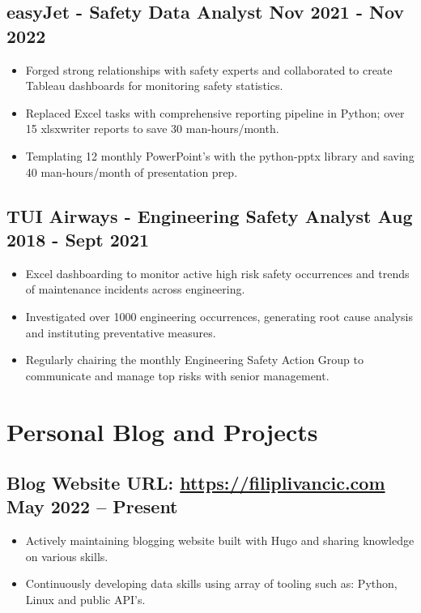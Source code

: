 \documentclass[a4paper,9pt]{article}
\begin{document}
\subsection*{\textbf{easyJet - Safety Data Analyst} \hfill  Nov 2021 - Nov 2022}
\begin{itemize}[noitemsep]
    \item Forged strong relationships with safety experts and collaborated to create Tableau dashboards for monitoring safety statistics.
    \item Replaced Excel tasks with comprehensive reporting pipeline in Python; over 15 xlsxwriter reports to save 30 man-hours/month.
    \item Templating 12 monthly PowerPoint's with the python-pptx library and saving 40 man-hours/month of presentation prep.
\end{itemize}

\subsection*{\textbf{TUI Airways - Engineering Safety Analyst} \hfill  Aug 2018 - Sept 2021}
\begin{itemize}[noitemsep]
	\item Excel dashboarding to monitor active high risk safety occurrences and trends of maintenance incidents across engineering.
	\item Investigated over 1000 engineering occurrences, generating root cause analysis and instituting preventative measures.
    \item Regularly chairing the monthly Engineering Safety Action Group to communicate and manage top risks with senior management.
\end{itemize}

\section*{Personal Blog and Projects}

\subsection*{\textbf{Blog Website URL}: \url{https://filiplivancic.com} \hfill  May 2022 – Present}
\begin{itemize}[noitemsep]
	\item  Actively maintaining blogging website built with Hugo and sharing knowledge on various skills.
    \item  Continuously developing data skills using array of tooling such as: Python, Linux and public API's.
\end{itemize}
\end{document}
